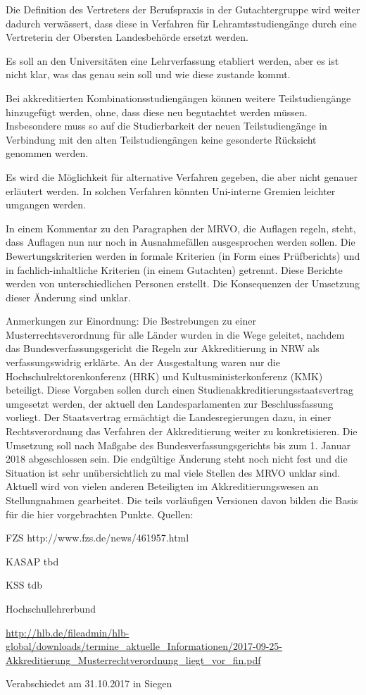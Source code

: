 \documentclass[DIV=calc]{scrartcl}
\begin{document}
\begin{compactitem}
\item Die Definition des Vertreters der Berufspraxis in der Gutachtergruppe wird weiter dadurch verwässert, dass diese in Verfahren für Lehramtsstudiengänge durch eine Vertreterin der Obersten Landesbehörde ersetzt werden.
\item Es soll an den Universitäten eine \glqq Lehrverfassung\grqq{} etabliert werden, aber es ist nicht klar, was das genau sein soll und wie diese zustande kommt.
\item Bei akkreditierten Kombinationsstudiengängen können weitere Teilstudiengänge hinzugefügt werden, ohne, dass diese neu begutachtet werden müssen. Insbesondere muss so auf die Studierbarkeit der neuen Teilstudiengänge in Verbindung mit den alten Teilstudiengängen keine gesonderte Rücksicht genommen werden.
\item Es wird die Möglichkeit für alternative Verfahren gegeben, die aber nicht genauer erläutert werden. In solchen Verfahren könnten Uni-interne Gremien leichter umgangen werden.
\item In einem Kommentar zu den Paragraphen der MRVO, die Auflagen regeln, steht, dass Auflagen nun nur noch in Ausnahmefällen ausgesprochen werden sollen. Die Bewertungskriterien werden in formale Kriterien (in Form eines Prüfberichts) und in fachlich-inhaltliche Kriterien (in einem Gutachten) getrennt. Diese Berichte werden von unterschiedlichen Personen erstellt. Die Konsequenzen der Umsetzung dieser Änderung sind unklar.
\end{compactitem}

Anmerkungen zur Einordnung:
Die Bestrebungen zu einer Musterrechtsverordnung für alle Länder wurden in die Wege geleitet, nachdem das Bundesverfassungsgericht die Regeln zur Akkreditierung in NRW als verfassungswidrig erklärte. An der Ausgestaltung waren nur die Hochschulrektorenkonferenz (HRK) und Kultusministerkonferenz (KMK) beteiligt.
Diese Vorgaben sollen durch einen Studienakkreditierungsstaatsvertrag umgesetzt werden, der aktuell den Landesparlamenten zur Beschlussfassung vorliegt. Der Staatsvertrag ermächtigt die Landesregierungen dazu, in einer Rechtsverordnung das Verfahren der Akkreditierung weiter zu konkretisieren. Die Umsetzung soll nach Maßgabe des Bundesverfassungsgerichts bis zum 1. Januar 2018 abgeschlossen sein. Die endgültige Änderung steht noch nicht fest und die Situation ist sehr unübersichtlich zu mal viele Stellen des MRVO unklar sind.
Aktuell wird von vielen anderen Beteiligten im Akkreditierungswesen an Stellungnahmen gearbeitet. Die teils vorläufigen Versionen davon bilden die Basis für die hier vorgebrachten Punkte.
Quellen:
\begin{compactitem}
\item FZS http://www.fzs.de/news/461957.html
\item KASAP tbd
\item KSS tdb
\item Hochschullehrerbund
\item \url{http://hlb.de/fileadmin/hlb-global/downloads/termine_aktuelle_Informationen/2017-09-25-Akkreditierung_Musterrechtverordnung_liegt_vor_fin.pdf}
\end{compactitem}

\vspace{-0.5\baselineskip}
    \begin{flushright}
        Verabschiedet am 31.10.2017 in Siegen
    \end{flushright}
\end{document}

